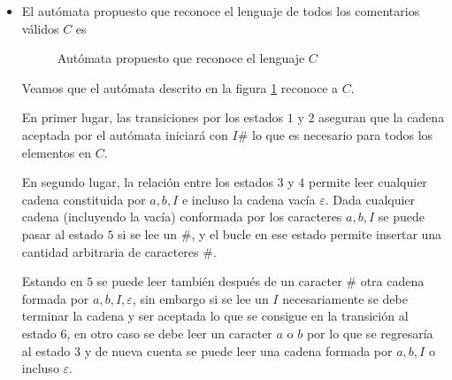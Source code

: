 \documentclass{article}
\begin{document}
\begin{itemize}
    \item [\colemph{A)}]El autómata propuesto que reconoce el lenguaje de todos los comentarios válidos $C$ es 
    \begin{figure}[!ht]
        \centering
        \caption{Autómata propuesto que reconoce el lenguaje $C$}
        \label{fig: NFA-Comentarios}
    \end{figure}

    Veamos que el autómata descrito en la figura \ref{fig: NFA-Comentarios} reconoce a $C$. 
    
    En primer lugar, las transiciones por los estados $1$ y $2$ aseguran que la cadena aceptada por el autómata iniciará con $I\#$ lo que es necesario para todos los elementos en $C$. 

    En segundo lugar, la relación entre los estados $3$ y $4$ permite leer cualquier cadena constituida por $a,b,I$ e incluso la cadena vacía $\varepsilon$. Dada cualquier cadena (incluyendo la vacía) conformada por los caracteres $a,b,I$ se puede pasar al estado $5$ si se lee un $\#$, y el bucle en ese estado permite insertar una cantidad arbitraria de caracteres $\#$. 

    Estando en $5$ se puede leer también después de un caracter $\#$ otra cadena formada por $a,b,I,\varepsilon$, sin embargo si se lee un $I$ necesariamente se debe terminar la cadena y ser aceptada lo que se consigue en la transición al estado $6$, en otro caso se debe leer un caracter $a$ o $b$ por lo que se regresaría al estado $3$ y de nueva cuenta se puede leer una cadena formada por $a,b,I$ o incluso $\varepsilon$.


\end{itemize}
\end{document}
